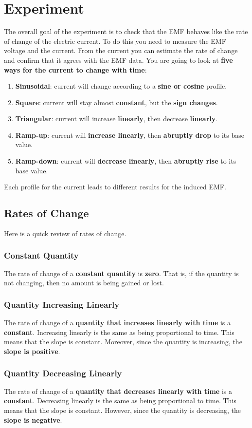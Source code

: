 \section{Experiment}
%
The overall goal of the experiment is to check that the EMF behaves like the rate of change of the electric current. To do this you need to measure the EMF voltage and the current. From the current you can estimate the rate of change and confirm that it agrees with the EMF data. You are going to look at \textbf{five ways for the current to change with time}:
\begin{enumerate}
	\item \textbf{Sinusoidal}: current will change according to a \textbf{sine or cosine} profile.
	\item \textbf{Square}: current will stay almost \textbf{constant}, but the \textbf{sign changes}.
	\item \textbf{Triangular}: current will increase \textbf{linearly}, then decrease \textbf{linearly}.
	\item \textbf{Ramp-up}: current will \textbf{increase linearly}, then \textbf{abruptly drop} to its base value.
	\item \textbf{Ramp-down}: current will \textbf{decrease linearly}, then \textbf{abruptly rise} to its base value.
\end{enumerate}
Each profile for the current leads to different results for the induced EMF.
%
\subsection{Rates of Change}
%
Here is a quick review of rates of change.
%
\subsubsection{Constant Quantity}
%
The rate of change of a \textbf{constant quantity} is \textbf{zero}. That is, if the quantity is not changing, then no amount is being gained or lost.
%
\subsubsection{Quantity Increasing Linearly}
%
The rate of change of a \textbf{quantity that increases linearly with time} is a \textbf{constant}. Increasing linearly is the same as being proportional to time. This means that the slope is constant. Moreover, since the quantity is increasing, the \textbf{slope is positive}.
%
\subsubsection{Quantity Decreasing Linearly}
%
The rate of change of a \textbf{quantity that decreases linearly with time} is a \textbf{constant}. Decreasing linearly is the same as being proportional to time. This means that the slope is constant. However, since the quantity is decreasing, the \textbf{slope is negative}.
%
